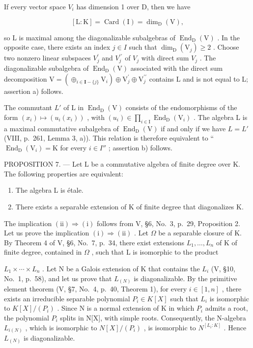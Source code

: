 If every vector space \(V_{i}\) has dimension 1 over D, then we have

\[
[ \mathrm{L}: \mathrm{K} ] = \operatorname{Card} (\mathrm{I}) = \dim_ {\mathrm{D}} (\mathrm{V}),
\]

so L is maximal among the diagonalizable subalgebras of \(\operatorname{End}_{\mathrm{D}}(\mathrm{V})\) . In the opposite case, there exists an index \(j \in I\) such that \(\dim_{\mathrm{D}}(\mathrm{V}_{j}) \geqslant 2\) . Choose two nonzero linear subspaces \(V_{j}^{\prime}\) and \(V_{j}^{\prime\prime}\) of \(V_{j}\) with direct sum \(V_{j}\) . The diagonalizable subalgebra of \(\operatorname{End}_{\mathrm{D}}(\mathrm{V})\) associated with the direct sum decomposition \(\mathrm{V} = (\oplus_{i \in \mathbf{I} - \{j\}} \mathrm{V}_{i}) \oplus \mathrm{V}_{j}^{\prime} \oplus \mathrm{V}_{j}^{\prime\prime}\) contains L and is not equal to L; assertion a) follows.

The commutant \(L'\) of L in \(\operatorname{End}_{\mathrm{D}}(\mathrm{V})\) consists of the endomorphisms of the form \((x_{i}) \mapsto (u_{i}(x_{i}))\) , with \((u_{i}) \in \prod_{i \in \mathrm{I}} \operatorname{End}_{\mathrm{D}}(\mathrm{V}_{i})\) . The algebra L is a maximal commutative subalgebra of \(\operatorname{End}_{\mathrm{D}}(\mathrm{V})\) if and only if we have \(L = L'\) (VIII, p.~261, Lemma 3, a)). This relation is therefore equivalent to `` \(\operatorname{End}_{\mathrm{D}}(\mathrm{V}_{i}) = \mathrm{K}\) for every \(i \in I''\) ; assertion b) follows.

PROPOSITION 7. --- Let L be a commutative algebra of finite degree over K. The following properties are equivalent:

\begin{enumerate}
\def\labelenumi{(\roman{enumi})}
\item
  The algebra L is étale.
\item
  There exists a separable extension of K of finite degree that diagonalizes K.
\end{enumerate}

The implication \((\mathrm{ii})\Rightarrow(\mathrm{i})\) follows from V, §6, No.~3, p.~29, Proposition 2. Let us prove the implication \((\mathrm{i})\Rightarrow(\mathrm{ii})\) . Let \(\Omega\) be a separable closure of K. By Theorem 4 of V, §6, No.~7, p.~34, there exist extensions \(L_{1},\ldots,L_{n}\) of K of finite degree, contained in \(\Omega\) , such that L is isomorphic to the product

\(L_{1} \times \cdots \times L_{n}\) . Let N be a Galois extension of K that contains the \(L_{i}\) (V, §10, No.~1, p.~58), and let us prove that \(L_{(N)}\) is diagonalizable. By the primitive element theorem (V, §7, No.~4, p.~40, Theorem 1), for every \(i \in [1, n]\) , there exists an irreducible separable polynomial \(P_{i} \in K[X]\) such that \(L_{i}\) is isomorphic to \(K[X]/(P_{i})\) . Since N is a normal extension of K in which \(P_{i}\) admits a root, the polynomial \(P_{i}\) splits in N{[}X{]}, with simple roots. Consequently, the N-algebra \(L_{i(N)}\) , which is isomorphic to \(N[X]/(P_{i})\) , is isomorphic to \(N^{[L_{i}:K]}\) . Hence \(L_{(N)}\) is diagonalizable.

